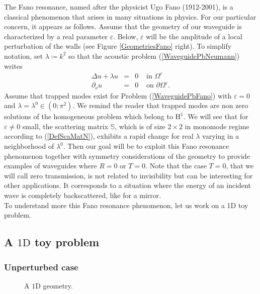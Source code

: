 \documentclass[11pt,a4paper]{report}
\newcommand{\eps}{\varepsilon}
\newcommand{\Om}{\Omega}
\newcommand{\mrm}[1]{\mathrm{#1}}
\newcommand{\mH}{\mrm{H}}
\begin{document}
The Fano resonance, named after the physicist Ugo Fano (1912-2001), is a classical phenomenon that arises in many situations in physics. For our particular concern, it appears as follows. Assume that the geometry of our waveguide is characterized by a real parameter $\eps$. Below, $\eps$ will be the amplitude of a local perturbation of the walls (see Figure \ref{GeometriesFano} right). To simplify notation, set $\lambda\coloneqq k^2$ so that the acoustic problem (\ref{WaveguidePbNeumann}) writes
\begin{equation}\label{WaveguidePbFano} 
\begin{array}{|rcll}
\Delta u+\lambda u&=&0&\mbox{ in }\Om^\eps \\[2pt]
\partial_\nu u&=&0&\mbox{ on }\partial\Om^\eps.
\end{array}
\end{equation}
Assume that trapped modes exist for Problem (\ref{WaveguidePbFano}) with $\eps=0$ and $\lambda=\lambda^0\in(0;\pi^2)$. We remind the reader that trapped modes are non zero solutions of the homogeneous problem which belong to $\mH^1$. We will see that for $\eps\ne0$ small, the scattering matrix $\mathbb{S}$, which is of size $2\times2$ in monomode regime according to (\ref{DefScaMatN}), exhibits a rapid change for real $\lambda$ varying in a neighborhood of $\lambda^0$. Then our goal will be to exploit this Fano resonance phenomenon together with symmetry considerations of the geometry to provide examples of waveguides where $R=0$ or $T=0$. Note that the case $T=0$, that we will call zero transmission, is not related to invisibility but can be interesting for other applications. It corresponds to a situation where the energy of an incident wave is completely backscattered, like for a mirror.  \\
\newline
To understand more this Fano resonance phenomenon, let us work on a 1D toy problem.


\subsection{A $\mrm{1D}$ toy problem}\label{SectionToyPb}

\subsubsection{Unperturbed case}

\begin{figure}[!ht]
\centering
{}
\caption{A $\mrm{1D}$ geometry. \label{Domain1D}} 
\end{figure}
\end{document}
